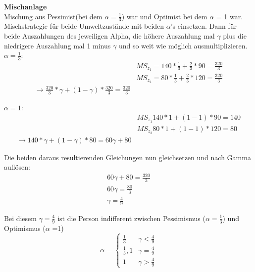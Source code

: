 \documentclass[11pt]{article}
\begin{document}
\newline
\textbf{Mischanlage}\\
Mischung aus Pessimist(bei dem \(\alpha = \frac{1}{3}\)) war und Optimist bei dem \(\alpha\) = 1 war. Mischstrategie für beide Umweltzustände mit beiden \(\alpha\)'s einsetzen. Dann für beide Auszahlungen des jeweiligen Alpha, die höhere Auszahlung mal \(\gamma\) plus die niedrigere Auszahlung mal 1 minus \(\gamma\) und so weit wie möglich ausmultiplizieren.\\
\(\alpha = \frac{1}{3}\): \\
\begin{equation*}
\begin{aligned}
&MS_{z_1}=140*\frac{1}{3} + \frac{2}{3}*90=\frac{320}{3}\\
&MS_{z_2}=80*\frac{1}{3} + \frac{2}{3}*120=\frac{320}{3}\\
\rightarrow \frac{320}{3}*\gamma + (1-\gamma)*\frac{320}{3} = \frac{320}{3}
\end{aligned}
\end{equation*}

\(\alpha = 1\): \\
\begin{equation*}
\begin{aligned}
&MS_{z_1}140*1 + (1-1)*90=140\\
&MS_{z_2}80*1 + (1-1)*120=80\\
\rightarrow 140*\gamma + (1-\gamma)*80 = 60\gamma+80
\end{aligned}
\end{equation*}

Die beiden daraus resultierenden Gleichungen nun gleichsetzen und nach Gamma auflösen:\\
\begin{equation*}
\begin{aligned}
60\gamma+80 = \frac{320}{3}\\
60\gamma = \frac{80}{3}\\
\gamma = \frac{4}{9}
\end{aligned}
\end{equation*}

Bei diesem \(\gamma = \frac{4}{9}\) ist die Person indifferent zwischen Pessimismus (\(\alpha = \frac{1}{3}\)) und Optimismus (\(\alpha\) =1)\\
\[ \alpha =\begin{cases} 
      \frac{1}{3} & \gamma < \frac{4}{9} \\
      {\frac{1}{3},1} & \gamma=\frac{4}{9} \\
      1 & \gamma > \frac{4}{9}
   \end{cases}
\]
\newline\\
\end{document}
